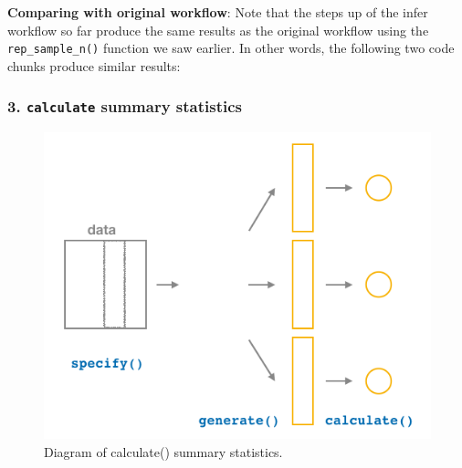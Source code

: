 \documentclass[
]{book}
\newenvironment{Shaded}{\begin{snugshade}}{\end{snugshade}}
\newcommand{\CommentTok}[1]{\textcolor[rgb]{0.56,0.35,0.01}{\textit{#1}}}
\newcommand{\DataTypeTok}[1]{\textcolor[rgb]{0.13,0.29,0.53}{#1}}
\newcommand{\DecValTok}[1]{\textcolor[rgb]{0.00,0.00,0.81}{#1}}
\newcommand{\KeywordTok}[1]{\textcolor[rgb]{0.13,0.29,0.53}{\textbf{#1}}}
\newcommand{\NormalTok}[1]{#1}
\newcommand{\OperatorTok}[1]{\textcolor[rgb]{0.81,0.36,0.00}{\textbf{#1}}}
\newcommand{\OtherTok}[1]{\textcolor[rgb]{0.56,0.35,0.01}{#1}}
\newcommand{\StringTok}[1]{\textcolor[rgb]{0.31,0.60,0.02}{#1}}
\begin{document}
\textbf{Comparing with original workflow}: Note that the steps up of the infer workflow so far produce the same results as the original workflow using the \texttt{rep\_sample\_n()} function we saw earlier. In other words, the following two code chunks produce similar results:

\begin{Shaded}
\end{Shaded}

\hypertarget{calculate-summary-statistics}{%
\subsubsection*{\texorpdfstring{3. \texttt{calculate} summary statistics}{3. calculate summary statistics}}\label{calculate-summary-statistics}}

\begin{figure}

{\centering \includegraphics[width=0.7\linewidth]{images/flowcharts/infer/calculate} 

}

\caption{Diagram of calculate() summary statistics.}\label{fig:infer-calculate}
\end{figure}
\end{document}
